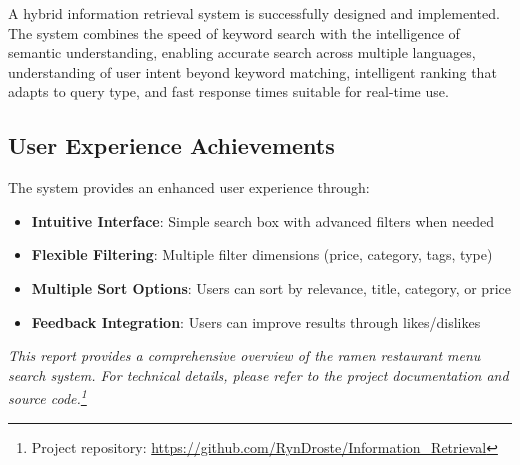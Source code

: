 \documentclass[11pt,a4paper]{article}
\begin{document}
A hybrid information retrieval system is successfully designed and implemented. The system combines the speed of keyword search with the intelligence of semantic understanding, enabling accurate search across multiple languages, understanding of user intent beyond keyword matching, intelligent ranking that adapts to query type, and fast response times suitable for real-time use.

\subsection{User Experience Achievements}

The system provides an enhanced user experience through:

\begin{itemize}
    \item \textbf{Intuitive Interface}: Simple search box with advanced filters when needed
    \item \textbf{Flexible Filtering}: Multiple filter dimensions (price, category, tags, type)
    \item \textbf{Multiple Sort Options}: Users can sort by relevance, title, category, or price
    \item \textbf{Feedback Integration}: Users can improve results through likes/dislikes
\end{itemize}

\vspace{0.5cm}

\textit{This report provides a comprehensive overview of the ramen restaurant menu search system. For technical details, please refer to the project documentation and source code.\footnote{Project repository: \url{https://github.com/RynDroste/Information_Retrieval}}}
\end{document}
